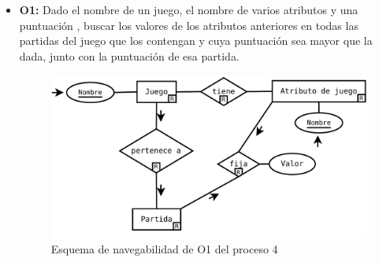 \begin{itemize}
	\item \textbf{O1:} Dado el nombre de un juego, el nombre de varios atributos y una puntuación
		, buscar los valores de los atributos anteriores en todas las partidas del juego
		que los contengan y cuya puntuación sea mayor que la dada, junto con la puntuación
		de esa partida.\\

	\begin{figure}[H]
		\centering
		\includegraphics[width=0.5\linewidth]{../Diagramas/pdf/Consejos/Op4-1.pdf}
		\caption{Esquema de navegabilidad de O1 del proceso 4}
	\end{figure}
\end{itemize}
